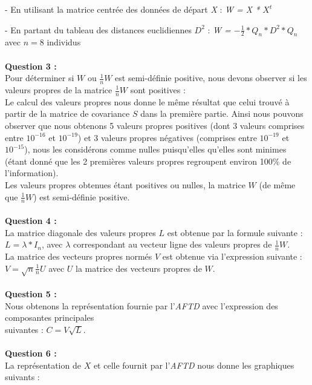 \documentclass[a4paper, 10pt]{article}
\begin{document}
- En utilisant la matrice centrée des données de départ \textit{X} : \textit{W = X * $X^{t}$}

- En partant du tableau des distances euclidiennes \textit{$D^{2}$} : \textit{W = $-\frac{1}{2} * Q_{n} * D^{2} * Q_{n}$} avec $n = 8$ individus\\ \\
\textbf{Question 3 :}\\
Pour déterminer si $W$ ou $\frac{1}{n}W$ est semi-définie positive, nous devons observer si les valeurs propres de la matrice $\frac{1}{n}W$
sont positives :\\
Le calcul des valeurs propres nous donne le même résultat que celui trouvé à partir de la matrice de covariance $S$ dans la première partie.
Ainsi nous pouvons observer que nous obtenons 5 valeurs propres positives (dont 3 valeurs comprises entre $10^{-16}$ et $10^{-19}$) et
3 valeurs propres négatives (comprises entre $10^{-19}$ et $10^{-15}$), nous les considérons comme nulles puisqu'elles qu'elles sont minimes
(étant donné que les 2 premières valeurs propres regroupent environ 100\% de l'information).\\
Les valeurs propres obtenues étant positives ou nulles, la matrice $W$ (de même que $\frac{1}{n}W$) est semi-définie positive.\\ \\
\textbf{Question 4 :}\\
La matrice diagonale des valeurs propres $L$ est obtenue par la formule suivante : $L = \lambda * I_{n}$, avec $\lambda$ correspondant
au vecteur ligne des valeurs propres de $\frac{1}{n}W$.\\
La matrice des vecteurs propres normés $V$ est obtenue via l'expression suivante : $V = \sqrt{n}\frac{1}{n}U$ avec $U$ la matrice des vecteurs
propres de $W$.\\ \\
\textbf{Question 5 :}\\
Nous obtenons la représentation fournie par l'\textit{AFTD} avec l'expression des composantes principales\\suivantes : $C = V\sqrt{L}$.\\ \\
\textbf{Question 6 :}\\
La représentation de $X$ et celle fournit par l'\textit{AFTD} nous donne les graphiques suivants :
\end{document}
